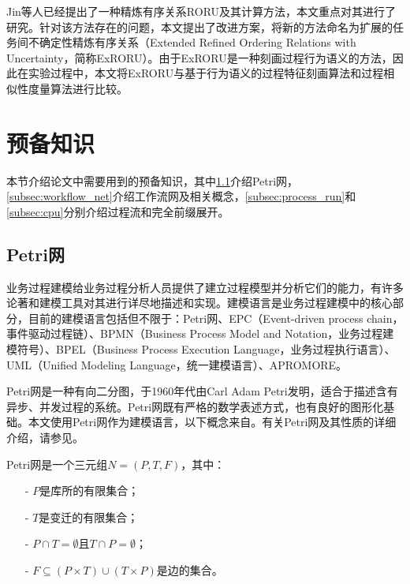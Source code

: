 Jin等人已经提出了一种精炼有序关系RORU及其计算方法\cite{jin2014computing}，本文重点对其进行了研究。针对该方法存在的问题，本文提出了改进方案，将新的方法命名为扩展的任务间不确定性精炼有序关系（Extended Refined Ordering Relations with Uncertainty，简称ExRORU）。由于ExRORU是一种刻画过程行为语义的方法，因此在实验过程中，本文将ExRORU与基于行为语义的过程特征刻画算法和过程相似性度量算法进行比较。

\section{预备知识}\label{sec:preliminaries}
本节介绍论文中需要用到的预备知识，其中\ref{subsec:petrinet}介绍Petri网，\ref{subsec:workflow_net}介绍工作流网及相关概念，\ref{subsec:process_run}和\ref{subsec:cpu}分别介绍过程流和完全前缀展开。

\subsection{Petri网}\label{subsec:petrinet}
业务过程建模给业务过程分析人员提供了建立过程模型并分析它们的能力，有许多论著和建模工具对其进行详尽地描述和实现。建模语言是业务过程建模中的核心部分，目前的建模语言包括但不限于：Petri网、EPC（Event-driven process chain，事件驱动过程链）、BPMN（Business Process Model and Notation，业务过程建模符号）、BPEL（Business Process Execution Language，业务过程执行语言）、UML（Unified Modeling Language，统一建模语言）、APROMORE\cite{la2011apromore}。

Petri网是一种有向二分图，于1960年代由Carl Adam Petri发明\cite{petri1962kommunikation}，适合于描述含有异步、并发过程的系统。Petri网既有严格的数学表述方式，也有良好的图形化基础。本文使用Petri网作为建模语言，以下概念来自。有关Petri网及其性质的详细介绍，请参见。

\begin{definition}[Petri网]\label{def:petrinet}
Petri网是一个三元组$N=(P,T,F)$，其中：
  \begin{itemize}
  	\item[-] $P$是库所的有限集合；
  	\item[-] $T$是变迁的有限集合；
  	\item[-] $P\cap T=\emptyset$且$T\cap P=\emptyset$；
  	\item[-] $F\subseteq(P\times T)\cup(T\times P)$是边的集合。
  \end{itemize}
\end{definition}

